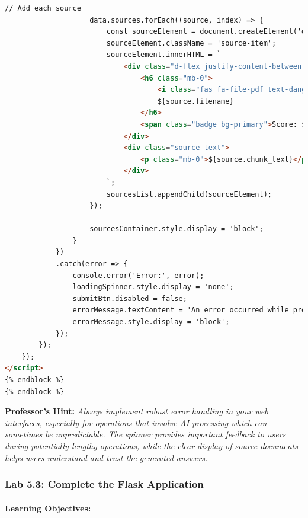 \documentclass[
  screen,review,acmlarge]{acmart}
\begin{document}
\begin{lstlisting}[language=HTML]
                    // Add each source
                    data.sources.forEach((source, index) => {
                        const sourceElement = document.createElement('div');
                        sourceElement.className = 'source-item';
                        sourceElement.innerHTML = `
                            <div class="d-flex justify-content-between align-items-center mb-2">
                                <h6 class="mb-0">
                                    <i class="fas fa-file-pdf text-danger me-2"></i>
                                    ${source.filename}
                                </h6>
                                <span class="badge bg-primary">Score: ${source.rerank_score.toFixed(2)}</span>
                            </div>
                            <div class="source-text">
                                <p class="mb-0">${source.chunk_text}</p>
                            </div>
                        `;
                        sourcesList.appendChild(sourceElement);
                    });
                    
                    sourcesContainer.style.display = 'block';
                }
            })
            .catch(error => {
                console.error('Error:', error);
                loadingSpinner.style.display = 'none';
                submitBtn.disabled = false;
                errorMessage.textContent = 'An error occurred while processing your question. Please try again.';
                errorMessage.style.display = 'block';
            });
        });
    });
</script>
{% endblock %}
{% endblock %}
\end{lstlisting}

\textbf{Professor's Hint:} \emph{Always implement robust error handling in your web interfaces, especially for operations that involve AI processing which can sometimes be unpredictable. The spinner provides important feedback to users during potentially lengthy operations, while the clear display of source documents helps users understand and trust the generated answers.}

\subsubsection{Lab 5.3: Complete the Flask Application}\label{lab-5.3-complete-the-flask-application}

\paragraph{Learning Objectives:}\label{learning-objectives-7}
\end{document}
